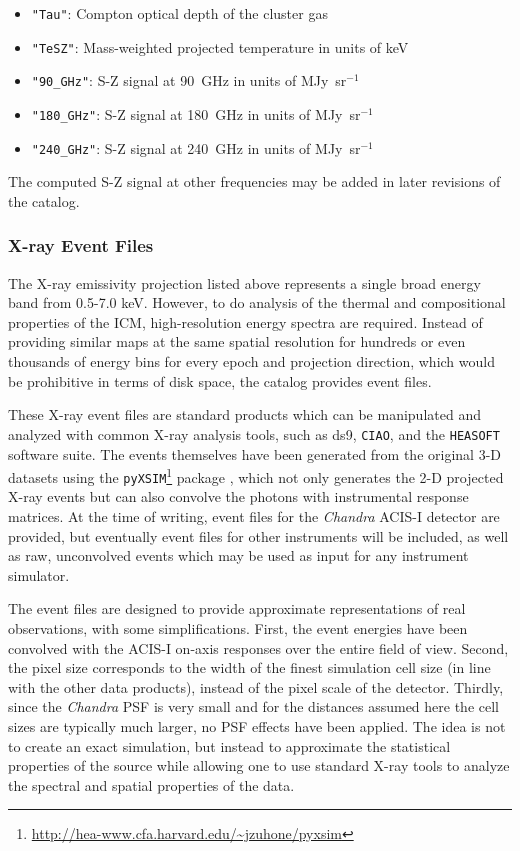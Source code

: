 \documentclass{emulateapj}
\newcommand{\code}[1]{\texttt{#1}}
\begin{document}
\begin{itemize}
\item \code{"Tau"}: Compton optical depth of the cluster gas
\item \code{"TeSZ"}: Mass-weighted projected temperature in units of keV
\item \code{"90\_GHz"}: S-Z signal at 90~GHz in units of MJy~sr$^{-1}$
\item \code{"180\_GHz"}: S-Z signal at 180~GHz in units of MJy~sr$^{-1}$
\item \code{"240\_GHz"}: S-Z signal at 240~GHz in units of MJy~sr$^{-1}$
\end{itemize}

The computed S-Z signal at other frequencies may be added in later revisions of the catalog.

\subsubsection{X-ray Event Files}\label{sec:xray}

The X-ray emissivity projection listed above represents a single broad energy band from 0.5-7.0 keV. However, to do analysis of the thermal and compositional properties of the ICM, high-resolution energy spectra are required. Instead of providing similar maps at the same spatial resolution for hundreds or even thousands of energy bins for every epoch and projection direction, which would be prohibitive in terms of disk space, the catalog provides event files.

These X-ray event files are standard products which can be manipulated and analyzed with common X-ray analysis tools, such as ds9, \code{CIAO}, and the \code{HEASOFT} software suite. The events themselves have been generated from the original 3-D datasets using the \code{pyXSIM}\footnote{\url{http://hea-www.cfa.harvard.edu/~jzuhone/pyxsim}} package \citep{zuh14}, which not only generates the 2-D projected X-ray events but can also convolve the photons with instrumental response matrices. At the time of writing, event files for the {\it Chandra} ACIS-I detector are provided, but eventually event files for other instruments will be included, as well as raw, unconvolved events which may be used as input for any instrument simulator.

The event files are designed to provide approximate representations of real observations, with some simplifications. First, the event energies have been convolved with the ACIS-I on-axis responses over the entire field of view. Second, the pixel size corresponds to the width of the finest simulation cell size (in line with the other data products), instead of the pixel scale of the detector. Thirdly, since the {\it Chandra} PSF is very small and for the distances assumed here the cell sizes are typically much larger, no PSF effects have been applied. The idea is not to create an exact simulation, but instead to approximate the statistical properties of the source while allowing one to use standard X-ray tools to analyze the spectral and spatial properties of the data.
\end{document}
